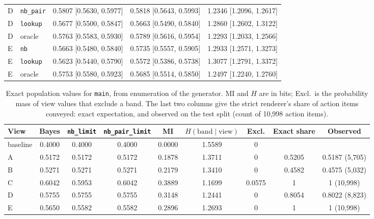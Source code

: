 \documentclass[11pt]{article}
\newcommand{\code}[1]{\texttt{#1}}
\begin{document}
\begin{table}[htbp]
\begin{tabular}{@{}llccc@{}}
D & \code{nb\_pair} & 0.5807 [0.5630, 0.5977] & 0.5818 [0.5643, 0.5993] & 1.2346 [1.2096, 1.2617] \\
D & \code{lookup} & 0.5677 [0.5500, 0.5847] & 0.5663 [0.5490, 0.5840] & 1.2860 [1.2602, 1.3122] \\
D & oracle & 0.5763 [0.5583, 0.5930] & 0.5789 [0.5616, 0.5954] & 1.2293 [1.2033, 1.2566] \\
\midrule
E & \code{nb} & 0.5663 [0.5480, 0.5840] & 0.5735 [0.5557, 0.5905] & 1.2933 [1.2571, 1.3273] \\
E & \code{lookup} & 0.5623 [0.5440, 0.5790] & 0.5572 [0.5386, 0.5738] & 1.3077 [1.2791, 1.3372] \\
E & oracle & 0.5753 [0.5580, 0.5923] & 0.5685 [0.5514, 0.5850] & 1.2497 [1.2240, 1.2760] \\
\bottomrule
\end{tabular}
\end{table}

\begin{table}[htbp]
\centering\footnotesize
\caption{Exact population values for \code{main}, from enumeration of the generator. MI and $H$ are in bits; Excl.\ is the probability mass of view values that exclude a band. The last two columns give the strict renderer's share of action items conveyed: exact expectation, and observed on the test split (count of 10,998 action items).}
\label{tab:population}
\setlength{\tabcolsep}{4pt}
\begin{tabular}{@{}lcccccccc@{}}
\toprule
View & Bayes & \code{nb\_limit} & \code{nb\_pair\_limit} & MI & $H(\text{band} \mid \text{view})$ & Excl. & Exact share & Observed \\
\midrule
baseline & 0.4000 & 0.4000 & 0.4000 & 0.0000 & 1.5589 & 0 & & \\
A & 0.5172 & 0.5172 & 0.5172 & 0.1878 & 1.3711 & 0 & 0.5205 & 0.5187 (5,705) \\
B & 0.5271 & 0.5271 & 0.5271 & 0.2179 & 1.3410 & 0 & 0.4582 & 0.4575 (5,032) \\
C & 0.6042 & 0.5953 & 0.6042 & 0.3889 & 1.1699 & 0.0575 & 1 & 1 (10,998) \\
D & 0.5755 & 0.5755 & 0.5755 & 0.3148 & 1.2441 & 0 & 0.8054 & 0.8022 (8,823) \\
E & 0.5650 & 0.5582 & 0.5582 & 0.2896 & 1.2693 & 0 & 1 & 1 (10,998) \\
\bottomrule
\end{tabular}
\end{table}
\end{document}
